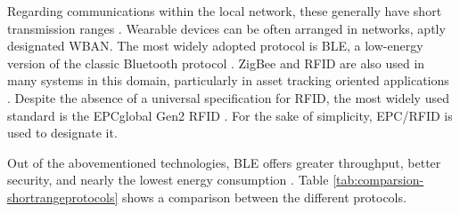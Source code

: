 Regarding communications within the local network, these generally have short transmission ranges \cite{Baker2017}. Wearable devices can be often arranged in networks, aptly designated \acf{WBAN}. The most widely adopted protocol is \acf{BLE}, a low-energy version of the classic Bluetooth protocol \cite{Doukas2012, Wu2019, Wu2020}. ZigBee and \acf{RFID} are also used in many systems in this domain, particularly in asset tracking oriented applications \cite{Fuhrer2006, Catarinucci2015, Adame2018}. Despite the absence of a universal specification for \acs{RFID}, the most widely used standard is the EPCglobal Gen2 RFID \cite{EPCglobal2006}. For the sake of simplicity, \acs{EPC/RFID} is used to designate it. \bigskip

Out of the abovementioned technologies, \acs{BLE} offers greater throughput, better security, and nearly the lowest energy consumption \cite{dementyev2013power}. Table \ref{tab:comparsion-shortrangeprotocols} shows a comparison between the different protocols.

